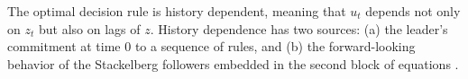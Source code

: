 
The  optimal decision rule  is history dependent, meaning that
$u_t$ depends not only on $z_t$ but also on lags of $z$.
 History
dependence has two sources: (a) the leader's
commitment  at time
$0$
 to a sequence of rules, and
(b) the forward-looking behavior of the
Stackelberg followers embedded in the second block of equations
.
